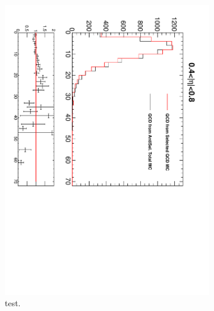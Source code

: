 \begin{figure}[htbp]
\begin{subfigure}{0.45\textwidth}
    \includegraphics*[trim = 0mm 0mm 15mm 0mm, clip, width=\textwidth, angle=90]{MetCompare_anti_eta2.pdf}
    \caption{test.}
    \label{fig:qcd_met_eta2}
  \end{subfigure}
  \begin{subfigure}{0.45\textwidth}
    \centering

\end{subfigure}
\end{figure}
